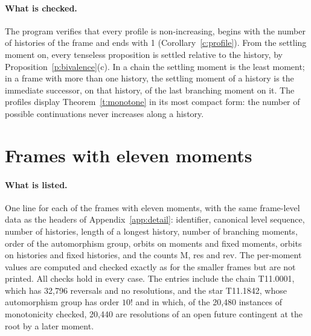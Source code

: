 \documentclass{situationist-preprint}
\begin{document}
\paragraph{What is checked.} The program verifies that every profile is non-increasing, begins with the number of histories of the frame and ends with 1 (Corollary~\ref{c:profile}). From the settling moment on, every tenseless proposition is settled relative to the history, by Proposition~\ref{p:bivalence}(c). In a chain the settling moment is the least moment; in a frame with more than one history, the settling moment of a history is the immediate successor, on that history, of the last branching moment on it. The profiles display Theorem~\ref{t:monotone} in its most compact form: the number of possible continuations never increases along a history.



\section{Frames with eleven moments}\label{app:eleven}

\paragraph{What is listed.} One line for each of the \NFramesEleven{} frames with eleven moments, with the same frame-level data as the headers of Appendix~\ref{app:detail}: identifier, canonical level sequence, number of histories, length of a longest history, number of branching moments, order of the automorphism group, orbits on moments and fixed moments, orbits on histories and fixed histories, and the counts M, res and rev. The per-moment values are computed and checked exactly as for the smaller frames but are not printed. All checks hold in every case. The entries include the chain T11.0001, which has 32,796 reversals and no resolutions, and the star T11.1842, whose automorphism group has order $10!$ and in which, of the 20,480 instances of monotonicity checked, 20,440 are resolutions of an open future contingent at the root by a later moment.


\end{document}
